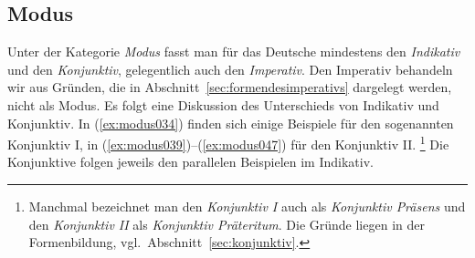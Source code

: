 \subsection{Modus}
\label{sec:modus}

Unter der Kategorie \textit{Modus} fasst man für das Deutsche mindestens den \textit{Indikativ} und den \textit{Konjunktiv}, gelegentlich auch den \textit{Imperativ}.
Den Imperativ behandeln wir aus Gründen, die in Abschnitt~\ref{sec:formendesimperativs} dargelegt werden, nicht als Modus.
Es folgt eine Diskussion des Unterschieds von Indikativ und Konjunktiv.
In (\ref{ex:modus034}) finden sich einige Beispiele für den sogenannten Konjunktiv I, in (\ref{ex:modus039})--(\ref{ex:modus047}) für den Konjunktiv II.%
\footnote{Manchmal bezeichnet man den \textit{Konjunktiv I} auch als \textit{Konjunktiv Präsens} und den \textit{Konjunktiv II} als \textit{Konjunktiv Präteritum}.
Die Gründe liegen in der Formenbildung, vgl.\ Abschnitt~\ref{sec:konjunktiv}.}
Die Konjunktive folgen jeweils den parallelen Beispielen im Indikativ.

\begin{exe}
  \ex \label{ex:modus034}
  \begin{xlist}
\Np
  \end{xlist}
  \ex \label{ex:modus039}
  \begin{xlist}
  \end{xlist}
  \ex \label{ex:modus044}
  \begin{xlist}
  \end{xlist}
  \ex \label{ex:modus047}
  \begin{xlist}
  \end{xlist}
\end{exe}

